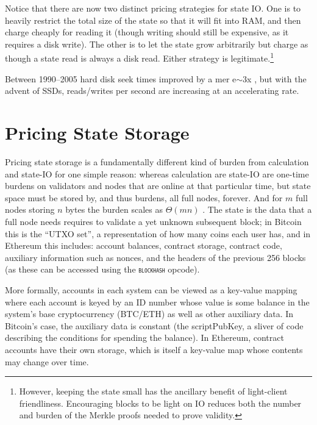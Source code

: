\documentclass[12pt, final]{article}
\newcommand{\opcode}[1]{\textsc{\texttt{#1}}}
\begin{document}
Notice that there are now two distinct pricing strategies for state IO. One is to heavily restrict the total size of the state so that it will fit into RAM, and then charge cheaply for reading it (though writing should still be expensive, as it requires a disk write). The other is to let the state grow arbitrarily but charge as though a state read is always a disk read. Either strategy is legitimate.\footnote{However, keeping the state small has the ancillary benefit of light-client friendliness.  Encouraging blocks to be light on IO reduces both the number and burden of the Merkle proofs needed to prove validity.}

Between 1990--2005 hard disk seek times improved by a mer e$\sim \!\! 3$x \cite{ibm2011}, but with the advent of SSDs, reads/writes per second are increasing at an accelerating rate.






\section{Pricing State Storage}
\label{sect:storage}

Pricing state storage is a fundamentally different kind of burden from calculation and state-IO for one simple reason: whereas calculation are state-IO are one-time burdens on validators and nodes that are online at that particular time, but state space must be stored by, and thus burdens, all full nodes, forever. And for $m$ full nodes storing $n$ bytes the burden scales as $\Theta(m n)$ . The state is the data that a full node needs requires to validate a yet unknown subsequent block; in Bitcoin this is the ``UTXO set'', a representation of how many coins each user has, and in Ethereum this includes: account balances, contract storage, contract code, auxiliary information such as nonces, and the headers of the previous 256 blocks (as these can be accessed using the \opcode{blockhash} opcode).

More formally, accounts in each system can be viewed as a key-value mapping where each account is keyed by an ID number whose value is some balance in the system's base cryptocurrency (BTC/ETH) as well as other auxiliary data. In Bitcoin's case, the auxiliary data is constant (the scriptPubKey, a sliver of code describing the conditions for spending the balance). In Ethereum, contract accounts have their own storage, which is itself a key-value map whose contents may change over time.
\end{document}
